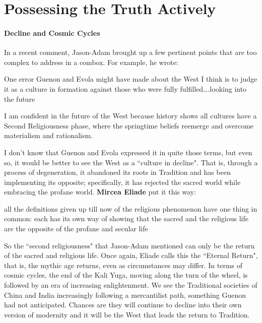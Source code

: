\section{Possessing the Truth Actively}

\paragraph{Decline and Cosmic Cycles}
In a recent comment, Jason-Adam brought up a few pertinent points that are too complex to address in a combox. For example, he wrote:

\begin{quotex}
One error Guenon and Evola might have made about the West I think is to judge it as a culture in formation against those who were fully fulfilled….looking into the future

I am confident in the future of the West because history shows all cultures have a Second Religiousness phase, where the springtime beliefs reemerge and overcome materialism and rationalism. 

\end{quotex}
I don't know that Guenon and Evola expressed it in quite those terms, but even so, it would be better to see the West as a ``culture in decline". That is, through a process of degeneration, it abandoned its roots in Tradition and has been implementing its opposite; specifically, it has rejected the sacred world while embracing the profane world. \textbf{Mircea Eliade} put it this way:

\begin{quotex}
all the definitions given up till now of the religious phenomenon have one thing in common: each has its own way of showing that the sacred and the religious life are the opposite of the profane and secular life 

\end{quotex}
So the ``second religiousness" that Jason-Adam mentioned can only be the return of the sacred and religious life. Once again, Eliade calls this the ``Eternal Return", that is, the mythic age returns, even as circumstances may differ. In terms of cosmic cycles, the end of the Kali Yuga, moving along the turn of the wheel, is followed by an era of increasing enlightenment. We see the Traditional societies of China and India increasingly following a mercantilist path, something Guenon had not anticipated. Chances are they will continue to decline into their own version of modernity and it will be the West that leads the return to Tradition.


